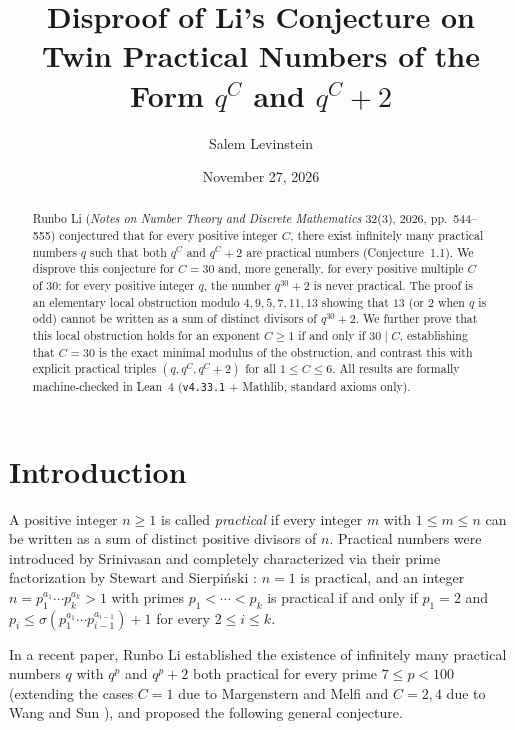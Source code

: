 \documentclass[11pt,a4paper]{article}
\title{Disproof of Li's Conjecture on Twin Practical Numbers of the Form $q^C$ and $q^C + 2$}
\author{Salem Levinstein}
\date{November 27, 2026}
\begin{document}
\maketitle

\begin{abstract}
Runbo Li (\emph{Notes on Number Theory and Discrete Mathematics} 32(3), 2026, pp.\ 544--555) conjectured that for every positive integer $C$, there exist infinitely many practical numbers $q$ such that both $q^C$ and $q^C + 2$ are practical numbers (Conjecture~1.1). We disprove this conjecture for $C = 30$ and, more generally, for every positive multiple $C$ of $30$: for every positive integer $q$, the number $q^{30} + 2$ is never practical. The proof is an elementary local obstruction modulo $4, 9, 5, 7, 11, 13$ showing that $13$ (or $2$ when $q$ is odd) cannot be written as a sum of distinct divisors of $q^{30} + 2$. We further prove that this local obstruction holds for an exponent $C \ge 1$ if and only if $30 \mid C$, establishing that $C = 30$ is the exact minimal modulus of the obstruction, and contrast this with explicit practical triples $(q, q^C, q^C + 2)$ for all $1 \le C \le 6$. All results are formally machine-checked in Lean~4 (\texttt{v4.33.1} + Mathlib, standard axioms only).
\end{abstract}

\section{Introduction}

A positive integer $n \ge 1$ is called \emph{practical} if every integer $m$ with $1 \le m \le n$ can be written as a sum of distinct positive divisors of $n$. Practical numbers were introduced by Srinivasan \cite{Srinivasan1948} and completely characterized via their prime factorization by Stewart \cite{Stewart1954} and Sierpi\'{n}ski \cite{Sierpinski1955}: $n = 1$ is practical, and an integer $n = p_1^{a_1} \cdots p_k^{a_k} > 1$ with primes $p_1 < \cdots < p_k$ is practical if and only if $p_1 = 2$ and $p_i \le \sigma(p_1^{a_1} \cdots p_{i-1}^{a_{i-1}}) + 1$ for every $2 \le i \le k$.

In a recent paper, Runbo Li \cite{Li2026} established the existence of infinitely many practical numbers $q$ with $q^p$ and $q^p + 2$ both practical for every prime $7 \le p < 100$ (extending the cases $C = 1$ due to Margenstern and Melfi and $C = 2, 4$ due to Wang and Sun \cite{WangSun2018}), and proposed the following general conjecture.
\end{document}
